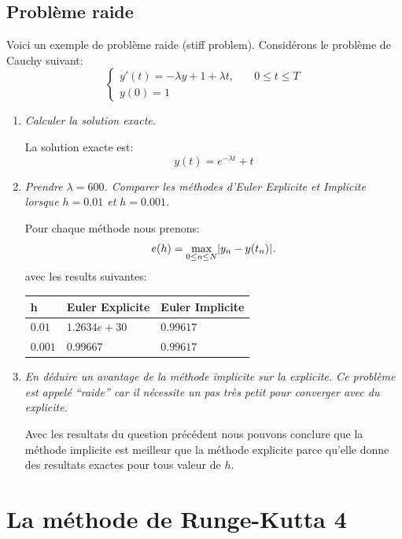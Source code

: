 \documentclass[a4paper,10pt]{article}
\begin{document}
\subsection{Problème raide}

Voici un exemple de problème raide (stiff problem). Considérons le problème de
Cauchy suivant:
\begin{equation}\label{eq:raide}
\left\{
\begin{array}{ll}
    y'(t) = -\lambda y + 1 + \lambda t, & \quad 0 \leq t \leq T \\
    y(0) = 1 &
\end{array}
\right.
\end{equation}

\begin{enumerate}
    \item \emph{Calculer la solution exacte.}

    La solution exacte est:
\[
    y(t) = e^{-\lambda t} + t
\]
    \item \emph{Prendre $\lambda = 600$. Comparer les méthodes d'Euler Explicite et
    Implicite lorsque $h = 0.01$ et $h = 0.001$.}

    Pour chaque méthode nous prenons:
\[
    e(h) = \max_{0 \leq n \leq N} \lvert y_n - y(t_n)\rvert_{}.
\]
avec les results suivantes:
\begin{center}
    \begin{tabular}{|l|l|l|}\hline
        h         & Euler Explicite         & Euler Implicite \\\hline
        $0.01$    & $1.2634e+30$            & $0.99617$ \\\hline
        $0.001$   & $0.99667$               & $0.99617$ \\\hline
    \end{tabular}
\end{center}

    \item \emph{En déduire un avantage de la méthode implicite sur la explicite. Ce
    problème est appelé ``raide'' car il nécessite un pas très petit pour
    converger avec du explicite.}

    Avec les resultats du question précédent nous pouvons conclure que la méthode
    implicite est meilleur que la méthode explicite parce qu'elle donne des resultats
    exactes pour tous valeur de $h$.

\end{enumerate}

\section{La méthode de Runge-Kutta 4}
\end{document}
